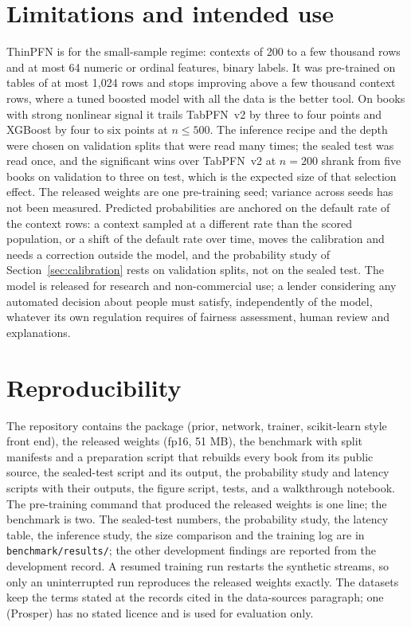 \documentclass[twocolumn,10pt]{article}
\begin{document}
\section{Limitations and intended use}

ThinPFN is for the small-sample regime: contexts of 200 to a few thousand rows and at most 64 numeric or ordinal
features, binary labels. It was pre-trained on tables of at most 1,024 rows and stops improving above a few thousand
context rows, where a tuned boosted model with all the data is the better tool. On books with strong nonlinear signal
it trails TabPFN~v2 by three to four points and XGBoost by four to six points at $n \le 500$. The inference recipe and the depth were chosen on
validation splits that were read many times; the sealed test was read once, and the significant wins over TabPFN~v2 at
$n=200$ shrank from five books on validation to three on test, which is the expected size of that selection effect. The
released weights are one pre-training seed; variance across seeds has not been measured. Predicted probabilities are
anchored on the default rate of the context rows: a context sampled at a different rate than the scored population, or
a shift of the default rate over time, moves the calibration and needs a correction outside the model, and the
probability study of Section~\ref{sec:calibration} rests on validation splits, not on the sealed test. The model is released for
research and non-commercial use; a lender considering any automated decision about people must satisfy, independently
of the model, whatever its own regulation requires of fairness assessment, human review and explanations.

\section{Reproducibility}

The repository contains the package (prior, network, trainer, scikit-learn style front end), the released weights (fp16,
51 MB), the benchmark with split manifests and a preparation script that rebuilds every book from its public source,
the sealed-test script and its output, the probability study and latency scripts with their outputs, the figure
script, tests, and a walkthrough notebook. The pre-training command
that produced the released weights is one line; the benchmark is two. The sealed-test numbers, the probability study, the latency table, the
inference study, the size comparison and the training log are in \texttt{benchmark/results/}; the other development findings are
reported from the development record. A resumed training run restarts the synthetic streams, so only an uninterrupted
run reproduces the released weights exactly. The datasets keep the terms stated at the records cited in the data-sources
paragraph; one (Prosper) has no stated licence and is used for evaluation only.



\end{document}
